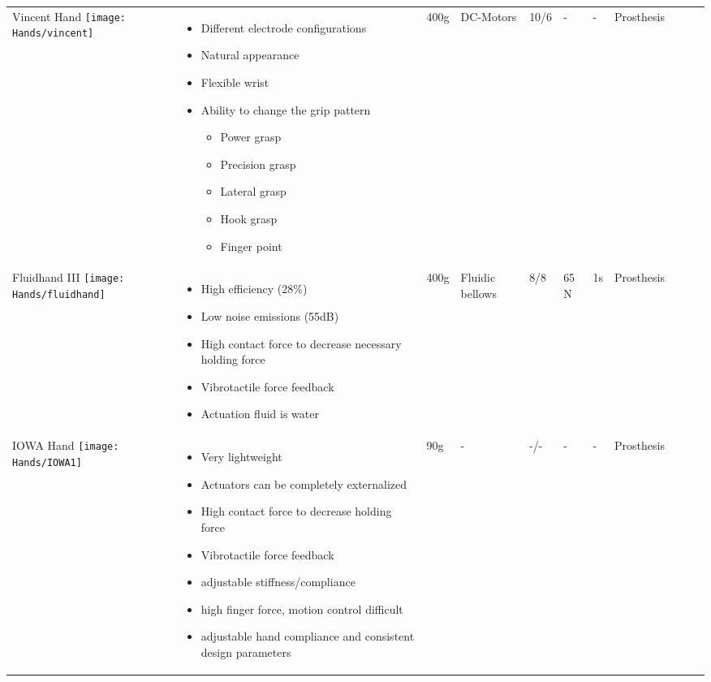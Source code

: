 \documentclass[main]{subfiles}
\begin{document}
\begin{longtable}{@{}p{6cm}p{4cm}p{0.7cm}p{1.2cm}p{1cm}p{1cm}p{1cm}p{1cm}p{1cm}p{1cm}p{2cm}@{}}
Vincent Hand \newline
\texttt{[image: Hands/vincent]} & 
\begin{itemize}\itemsep0em
\item Different electrode configurations
\item Natural appearance
\item Flexible wrist
\item Ability to change the grip pattern 
\begin{itemize}\itemsep0em
\item Power grasp
\item Precision grasp
\item Lateral grasp
\item Hook grasp
\item Finger point
\end{itemize}
\end{itemize} 
& 400g & DC-Motors & 10/6 & - & - & Prosthesis\\

Fluidhand III \newline
\texttt{[image: Hands/fluidhand]} & 
\begin{itemize}\itemsep0em
\item High efficiency (28\%)
\item Low noise emissions (55dB)
\item High contact force to decrease necessary holding force
\item Vibrotactile force feedback
\item Actuation fluid is water
\end{itemize}
& 400g & Fluidic bellows & 8/8 & 65 N & 1s & Prosthesis\\

IOWA Hand \newline
\texttt{[image: Hands/IOWA1]}& 
\begin{itemize}\itemsep0em
\item Very lightweight
\item Actuators can be completely externalized
\item High contact force to decrease holding force
\item Vibrotactile force feedback
\item adjustable stiffness/compliance
\item high finger force, motion control difficult
\item adjustable hand compliance and consistent design parameters
\end{itemize}
 & 90g & - & -/- & - & - & Prosthesis \\
 

\end{longtable}
\end{document}
